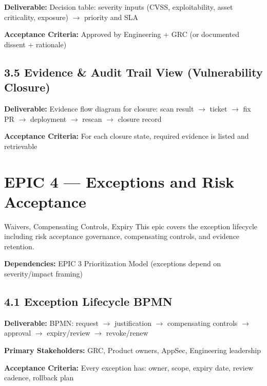 \documentclass[11pt,letterpaper]{article}
\newcommand{\storyfield}[2]{\textbf{#1:} #2}
\begin{document}
\begin{storycard}
\storyfield{Deliverable}{Decision table: severity inputs (CVSS, exploitability, asset criticality, exposure) $\rightarrow$ priority and SLA}

\storyfield{Acceptance Criteria}{Approved by Engineering + GRC (or documented dissent + rationale)}
\end{storycard}

\subsection{3.5 Evidence \& Audit Trail View (Vulnerability Closure)}

\begin{storycard}
\storyfield{Deliverable}{Evidence flow diagram for closure: scan result $\rightarrow$ ticket $\rightarrow$ fix PR $\rightarrow$ deployment $\rightarrow$ rescan $\rightarrow$ closure record}

\storyfield{Acceptance Criteria}{For each closure state, required evidence is listed and retrievable}
\end{storycard}

\newpage

\section{EPIC 4 --- Exceptions and Risk Acceptance}

\begin{epicbox}{Waivers, Compensating Controls, Expiry}
This epic covers the exception lifecycle including risk acceptance governance, compensating controls, and evidence retention.

\textbf{Dependencies:} EPIC 3 Prioritization Model (exceptions depend on severity/impact framing)
\end{epicbox}

\subsection{4.1 Exception Lifecycle BPMN}

\begin{storycard}
\storyfield{Deliverable}{BPMN: request $\rightarrow$ justification $\rightarrow$ compensating controls $\rightarrow$ approval $\rightarrow$ expiry/review $\rightarrow$ revoke/renew}

\storyfield{Primary Stakeholders}{GRC, Product owners, AppSec, Engineering leadership}

\storyfield{Acceptance Criteria}{Every exception has: owner, scope, expiry date, review cadence, rollback plan}
\end{storycard}
\end{document}
